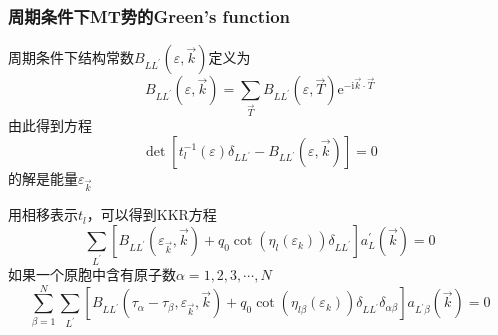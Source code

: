 \documentclass[cjk,slidestop,compress,mathserif,blue]{beamer}
\begin{document}
\frame
{
	\frametitle{周期条件下\textrm{MT}势的\textrm{Green's function}}
周期条件下结构常数$B_{LL^{\prime}}(\varepsilon,\vec k)$定义为
\begin{displaymath}
	B_{LL^{\prime}}(\varepsilon,\vec k)=\sum_{\vec T}B_{LL^{\prime}}(\varepsilon,\vec T)\mathrm{e}^{-\mathrm{i}\vec k\cdot\vec T}
\end{displaymath}
由此得到方程
\begin{displaymath}
	\det[t_l^{-1}(\varepsilon)\delta_{LL^{\prime}}-B_{LL^{\prime}}(\varepsilon,\vec k)]=0
\end{displaymath}
的解是能量$\varepsilon_{\vec k}$

用相移表示$t_l$，可以得到\textrm{KKR}方程
\begin{displaymath}
	\sum_{L^{\prime}}[B_{LL^{\prime}}(\varepsilon_{\vec k},\vec k)+q_0\cot(\eta_l(\varepsilon_k))\delta_{LL^{\prime}}]a_L^{\prime}(\vec k)=0
\end{displaymath}
如果一个原胞中含有原子数$\alpha=1,2,3,\cdots,N$
\begin{displaymath}
	\sum_{\beta=1}^N\sum_{L^{\prime}}[B_{LL^{\prime}}(\tau_{\alpha}-\tau_{\beta},\varepsilon_{\vec k},\vec k)+q_0\cot(\eta_{l\beta}(\varepsilon_k))\delta_{LL^{\prime}}\delta_{\alpha\beta}]a_{L^{\prime}\beta}(\vec k)=0
\end{displaymath}
}
\end{document}
